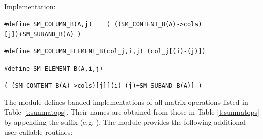 \begin{itemize}
  Implementation:

  \verb|#define SM_COLUMN_B(A,j)    ( ((SM_CONTENT_B(A)->cols)[j])+SM_SUBAND_B(A) )|

  \verb|#define SM_COLUMN_ELEMENT_B(col_j,i,j) (col_j[(i)-(j)])|

  \verb|#define SM_ELEMENT_B(A,i,j)|

  \hspace{1in} \verb|( (SM_CONTENT_B(A)->cols)[j][(i)-(j)+SM_SUBAND_B(A)] )|

\end{itemize}
The {\sunmatband} module defines banded implementations of all matrix
operations listed in Table \ref{t:sunmatops}. Their names are obtained
from those in Table \ref{t:sunmatops} by appending the
suffix  (e.g. ). 
The module {\sunmatband} provides the following additional user-callable routines:
